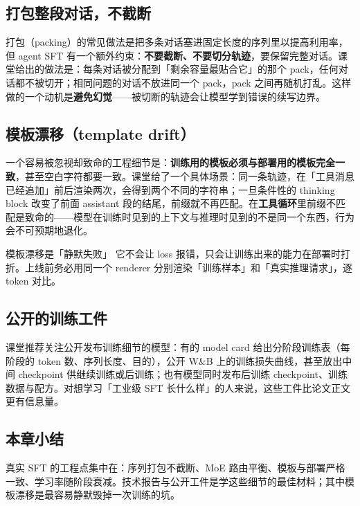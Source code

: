 \documentclass[a4paper]{article}
\begin{document}
\subsection{打包整段对话，不截断}

打包（packing）的常见做法是把多条对话塞进固定长度的序列里以提高利用率，但 agent SFT 有一个额外约束：\textbf{不要截断、不要切分轨迹}，要保留完整对话。课堂给出的做法是：每条对话被分配到「剩余容量最贴合它」的那个 pack，任何对话都不被切开；相同问题的对话不放进同一个 pack，pack 之间再随机打乱。这样做的一个动机是\textbf{避免幻觉}——被切断的轨迹会让模型学到错误的续写边界。

\subsection{模板漂移（template drift）}

一个容易被忽视却致命的工程细节是：\textbf{训练用的模板必须与部署用的模板完全一致}，甚至空白字符都要一致。课堂给了一个具体场景：同一条轨迹，在「工具消息已经追加」前后渲染两次，会得到两个不同的字符串；一旦条件性的 thinking block 改变了前面 assistant 段的结尾，前缀就不再匹配。在\textbf{工具循环}里前缀不匹配是致命的——模型在训练时见到的上下文与推理时见到的不是同一个东西，行为会不可预期地退化。

\begin{warningbox}{模板漂移是「静默失败」}
它不会让 loss 报错，只会让训练出来的能力在部署时打折。上线前务必用同一个 renderer 分别渲染「训练样本」和「真实推理请求」，逐 token 对比。
\end{warningbox}

\subsection{公开的训练工件}

课堂推荐关注公开发布训练细节的模型：有的 model card 给出分阶段训练表（每阶段的 token 数、序列长度、目的），公开 W\&B 上的训练损失曲线，甚至放出中间 checkpoint 供继续训练或后训练；也有模型同时发布后训练 checkpoint、训练数据与配方。对想学习「工业级 SFT 长什么样」的人来说，这些工件比论文正文更有信息量。

\subsection{本章小结}
真实 SFT 的工程点集中在：序列打包不截断、MoE 路由平衡、模板与部署严格一致、学习率随阶段衰减。技术报告与公开工件是学这些细节的最佳材料；其中模板漂移是最容易静默毁掉一次训练的坑。
\end{document}

